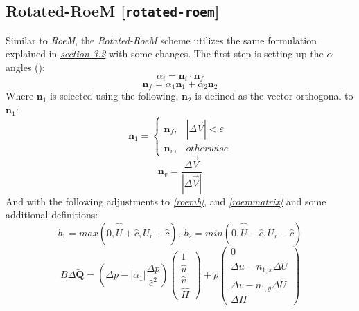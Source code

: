 \documentclass[a4paper, 12pt]{article}
\begin{document}
\subsection{Rotated-RoeM [\texttt{rotated-roem}]}
Similar to \textit{RoeM}, the \textit{Rotated-RoeM} scheme utilizes the same formulation explained in \hyperref[roem]{\textit{section 3.2}} with some changes. The first step is setting up the $\alpha$ angles (\cite{rotated-roem}):
\begin{equation}
    \alpha_i=\mathbf{n}_i\cdot\mathbf{n}_f
\end{equation}
\begin{equation}
    \mathbf{n}_f=\alpha_1\mathbf{n}_1+\alpha_2\mathbf{n}_2
\end{equation}
Where $\mathbf{n}_1$ is selected using the following, $\mathbf{n}_2$ is defined as the vector orthogonal to $\mathbf{n}_1$:
\begin{equation}
    \mathbf{n}_1= \begin{cases}
        \mathbf{n}_f ,&|\Delta\vec V|<\varepsilon\\
        \mathbf{n}_v ,&otherwise
    \end{cases}
\end{equation}
\begin{equation}
    \mathbf{n}_v = \dfrac{\Delta\vec V}{|\Delta\vec V|}
\end{equation}
And with the following adjustments to \hyperref[roemb]{\textit{\autoref{roemb}}}, and \hyperref[roemmatrix]{\textit{\autoref{roemmatrix}}} and some additional definitions:
\begin{equation}
    \tilde b_1 =max(0,\hat{\tilde U}+\hat c,\tilde U_r+\hat c), \: \tilde b_2=min(0,\hat{\tilde U}-\hat c,\tilde U_r-\hat c)
\end{equation}
\begin{equation}
    B\Delta \tilde{\textbf{Q}}= \left( \Delta p - |\alpha_1| \dfrac{\Delta p}{\hat c^2} \right)\begin{pmatrix}
        1\\\hat u\\\hat v\\\hat H
    \end{pmatrix}+\hat\rho\begin{pmatrix}
        0\\\Delta u-n_{1,x}\Delta \tilde U\\\Delta v-n_{1,y}\Delta\tilde U\\\Delta H
    \end{pmatrix}
\end{equation}
\end{document}
